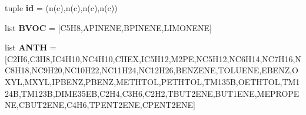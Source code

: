 \begin{DoxyCompactItemize}
\item 
\mbox{\label{namespacefitobs_a3d49997e21d33d11e8d33a027dc5fe72}} 
tuple {\bfseries id} = (n(c),n(c),n(c),n(c))
\item 
\mbox{\label{namespacefitobs_a7b107518ac6ed091ac03e0598d3650e0}} 
list {\bfseries B\+V\+OC} = \mbox{[}\textquotesingle{}C5\+H8\textquotesingle{},\textquotesingle{}A\+P\+I\+N\+E\+NE\textquotesingle{},\textquotesingle{}B\+P\+I\+N\+E\+NE\textquotesingle{},\textquotesingle{}L\+I\+M\+O\+N\+E\+NE\textquotesingle{}\mbox{]}
\item 
\mbox{\label{namespacefitobs_aeaaff3a86f56969731228ffbf36ba179}} 
list {\bfseries A\+N\+TH} = \mbox{[}\textquotesingle{}C2\+H6\textquotesingle{},\textquotesingle{}C3\+H8\textquotesingle{},\textquotesingle{}I\+C4\+H10\textquotesingle{},\textquotesingle{}N\+C4\+H10\textquotesingle{},\textquotesingle{}C\+H\+EX\textquotesingle{},\textquotesingle{}I\+C5\+H12\textquotesingle{},\textquotesingle{}M2\+PE\textquotesingle{},\textquotesingle{}N\+C5\+H12\textquotesingle{},\textquotesingle{}N\+C6\+H14\textquotesingle{},\textquotesingle{}N\+C7\+H16\textquotesingle{},\textquotesingle{}N\+C8\+H18\textquotesingle{},\textquotesingle{}N\+C9\+H20\textquotesingle{},\textquotesingle{}N\+C10\+H22\textquotesingle{},\textquotesingle{}N\+C11\+H24\textquotesingle{},\textquotesingle{}N\+C12\+H26\textquotesingle{},\textquotesingle{}B\+E\+N\+Z\+E\+NE\textquotesingle{},\textquotesingle{}T\+O\+L\+U\+E\+NE\textquotesingle{},\textquotesingle{}E\+B\+E\+NZ\textquotesingle{},\textquotesingle{}O\+X\+YL\textquotesingle{},\textquotesingle{}M\+X\+YL\textquotesingle{},\textquotesingle{}I\+P\+B\+E\+NZ\textquotesingle{},\textquotesingle{}P\+B\+E\+NZ\textquotesingle{},\textquotesingle{}M\+E\+T\+H\+T\+OL\textquotesingle{},\textquotesingle{}P\+E\+T\+H\+T\+OL\textquotesingle{},\textquotesingle{}T\+M135B\textquotesingle{},\textquotesingle{}O\+E\+T\+H\+T\+OL\textquotesingle{},\textquotesingle{}T\+M124B\textquotesingle{},\textquotesingle{}T\+M123B\textquotesingle{},\textquotesingle{}D\+I\+M\+E35\+EB\textquotesingle{},\textquotesingle{}C2\+H4\textquotesingle{},\textquotesingle{}C3\+H6\textquotesingle{},\textquotesingle{}C2\+H2\textquotesingle{},\textquotesingle{}T\+B\+U\+T2\+E\+NE\textquotesingle{},\textquotesingle{}B\+U\+T1\+E\+NE\textquotesingle{},\textquotesingle{}M\+E\+P\+R\+O\+P\+E\+NE\textquotesingle{},\textquotesingle{}C\+B\+U\+T2\+E\+NE\textquotesingle{},\textquotesingle{}C4\+H6\textquotesingle{},\textquotesingle{}T\+P\+E\+N\+T2\+E\+NE\textquotesingle{},\textquotesingle{}C\+P\+E\+N\+T2\+E\+NE\textquotesingle{}\mbox{]}

\end{DoxyCompactItemize}
